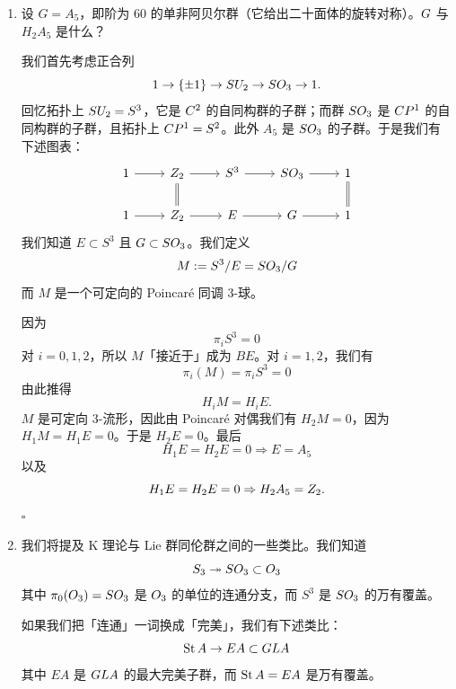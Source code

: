 \begin{enumerate}[label=\arabic*.]
\item 设 $G = A_5$，即阶为 60 的单非阿贝尔群（它给出二十面体的旋转对称）。$ G$ 与 $H_2A_5$ 是什么？

我们首先考虑正合列
\[
  1 \to \{\pm 1\} \to SU_2 \to SO_3 \to 1.
\]
回忆拓扑上 $SU_2 = S^3$，它是 $C^2$ 的自同构群的子群；而群 $SO_3$ 是 $C P^1$ 的自同构群的子群，且拓扑上 $C P^1 = S^2$。此外 $A_5$ 是 $SO_3$ 的子群。于是我们有下述图表：
\[
  \begin{tikzcd}
    1 \arrow[r] & \Z_2 \arrow[r] \arrow[d, equal] & S^3 \arrow[r] & \SO_3 \arrow[r] & 1 \arrow[d, equal] \\
    1 \arrow[r] & \Z_2 \arrow[r] & E \arrow[r] & G \arrow[r] & 1
  \end{tikzcd}
\]
我们知道 $E \subset S^3$ 且 $G \subset SO_3$。我们定义
\[
  M := S^3/E = SO_3/G
\]
而 $M$ 是一个可定向的 Poincaré 同调 3-球。

因为
\[
  \pi_iS^3 = 0
\]
对 $i=0,1,2$，所以 $M$「接近于」成为 $BE$。对 $i=1,2$，我们有
\[
  \pi_i(M) = \pi_iS^3 = 0
\]
由此推得
\[
  H_iM = H_iE.
\]
$M$ 是可定向 3-流形，因此由 Poincaré 对偶我们有 $H_2M = 0$，因为 $H_1M = H_1E = 0$。于是 $H_2E = 0$。最后
\[
  H_1E = H_2E = 0 \Rightarrow E = A_5
\]
以及
\[
  H_1E = H_2E = 0 \Rightarrow H_2A_5 = Z_2.
\]
\noindent$\square$

\item 我们将提及 K 理论与 Lie 群同伦群之间的一些类比。我们知道
\[
  S_3 \twoheadrightarrow SO_3 \subset O_3
\]
其中 $\pi_0(O_3) = SO_3$ 是 $O_3$ 的单位的连通分支，而 $S^3$ 是 $SO_3$ 的万有覆盖。

如果我们把「连通」一词换成「完美」，我们有下述类比：
\[
  \operatorname{St}A \to EA \subset GL A
\]
其中 $EA$ 是 $GL A$ 的最大完美子群，而 $\operatorname{St}A =  E A$ 是万有覆盖。


\end{enumerate}
